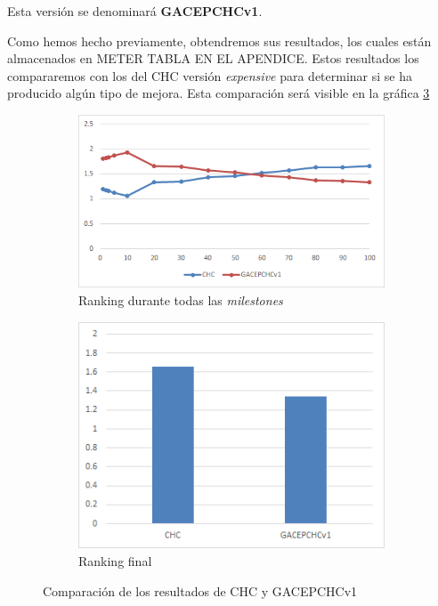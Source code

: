 Esta versión se denominará \textbf{GACEPCHCv1}.

Como hemos hecho previamente, obtendremos sus resultados, los cuales están almacenados en \color{red} METER TABLA EN EL APENDICE\color{black}. 
Estos resultados los compararemos con los del CHC versión \textit{expensive} para determinar si se ha producido algún tipo de mejora. 
Esta comparación será visible en la gráfica \ref{fig:CHCvsGACEPCHCv1}

\begin{figure}[h]
     \centering
     \begin{subfigure}[b]{0.45\textwidth}
         \centering
         \includegraphics[width=\textwidth]{imagenes/Experimental/CHCvsGACEPCHCv1.png}
         \caption{Ranking durante todas las \textit{milestones}}
         \label{fig:CHCvsGACEPCHCv1_lineas}
     \end{subfigure}
     \hfill
     \begin{subfigure}[b]{0.45\textwidth}
         \centering
         \includegraphics[width=\textwidth]{imagenes/Experimental/barras/CHCvsGACEPCHCv1.png}
         \caption{Ranking final}
         \label{fig:CHCvsGACEPCHCv1_barras}
     \end{subfigure}
        \caption{Comparación de los resultados de CHC y GACEPCHCv1}
        \label{fig:CHCvsGACEPCHCv1}
\end{figure}

